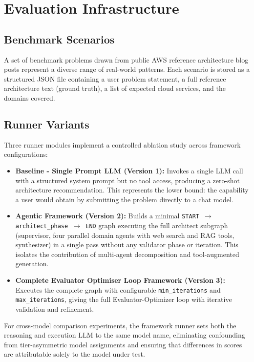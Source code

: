 \section{Evaluation Infrastructure}

\subsection{Benchmark Scenarios}

A set of benchmark problems drawn from public AWS reference architecture blog posts represent a diverse range of real-world patterns. Each scenario is stored as a structured JSON file containing a user problem statement, a full reference architecture text (ground truth), a list of expected cloud services, and the domains covered.

\subsection{Runner Variants}
\label{subsec:runner_variants}

Three runner modules implement a controlled ablation study across framework configurations:

\begin{itemize}
    \item \textbf{Baseline - Single Prompt LLM (Version 1):} Invokes a single LLM call with a structured system prompt but no tool access, producing a zero-shot architecture recommendation. This represents the lower bound: the capability a user would obtain by submitting the problem directly to a chat model.
    \item \textbf{Agentic Framework (Version 2):} Builds a minimal \texttt{START $\rightarrow$ architect\_phase $\rightarrow$ END} graph executing the full architect subgraph (supervisor, four parallel domain agents with web search and RAG tools, synthesizer) in a single pass without any validator phase or iteration. This isolates the contribution of multi-agent decomposition and tool-augmented generation.
    \item \textbf{Complete Evaluator Optimiser Loop Framework (Version 3):} Executes the complete graph with configurable \texttt{min\_iterations} and \texttt{max\_iterations}, giving the full Evaluator-Optimizer loop with iterative validation and refinement.
\end{itemize}

For cross-model comparison experiments, the framework runner sets both the reasoning and execution LLM to the same model name, eliminating confounding from tier-asymmetric model assignments and ensuring that differences in scores are attributable solely to the model under test.

